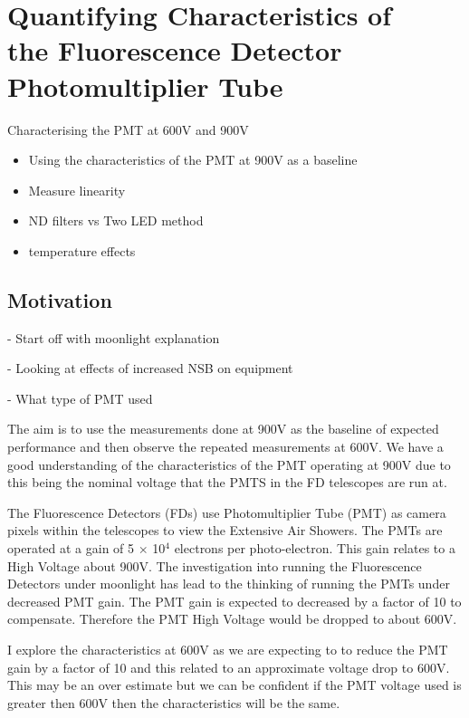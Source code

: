 \chapter[Quantifying Characteristics of the FD PMT]{\centering Quantifying Characteristics of \\ the Fluorescence Detector \\ Photomultiplier Tube \\}\label{Ch:PMTCharacter}

Characterising the PMT at 600V and 900V
\begin{itemize}
\item Using the characteristics of the PMT at 900V as a baseline
\item Measure linearity
\item ND filters vs Two LED method
\item temperature effects
\end{itemize}

\section{Motivation}

- Start off with moonlight explanation

- Looking at effects of increased NSB on equipment

- What type of PMT used

The aim is to use the measurements done at 900V as the baseline of expected performance and then observe the repeated measurements at 600V. We have a good  understanding of the characteristics of the PMT operating at 900V due to this being the nominal voltage that the PMTS in the FD telescopes are run at.

The Fluorescence Detectors (FDs) use Photomultiplier Tube (PMT) as camera pixels within the telescopes to view the Extensive Air Showers. The PMTs are operated at a gain of 5 $\times$ 10$^4$ electrons per photo-electron. This gain relates to a High Voltage about 900V. The investigation into running the Fluorescence Detectors under moonlight has lead to the thinking of running the PMTs under decreased PMT gain. The PMT gain is expected to decreased by a factor of 10 to compensate. Therefore the PMT High Voltage would be dropped to about 600V.

I explore the characteristics at 600V as we are expecting to to reduce the PMT gain by a factor of 10 and this related to an approximate voltage drop to 600V. This may be an over estimate but we can be confident if the PMT voltage used is greater then 600V then the characteristics will be the same.

